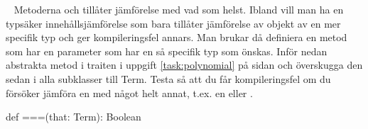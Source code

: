 \QUESTEND
















\QUESTBEGIN

\Task  \what~  Metoderna  och \code{==} tillåter jämförelse med vad som helst. Ibland vill man ha en typsäker innehållsjämförelse som bara tillåter jämförelse av objekt av en mer specifik typ och ger kompileringsfel annars. Man brukar då definiera en metod \code{===} som har en parameter  som har en så specifik typ som önskas. Inför nedan abstrakta metod \code{===} i traiten  i uppgift \ref{task:polynomial} på sidan \pageref{task:polynomial} och överskugga den sedan i alla subklasser till Term. Testa så att du får kompileringsfel om du försöker jämföra en  med något helt annat, t.ex. en  eller .
\begin{Code}
  def ===(that: Term): Boolean
\end{Code}


\SOLUTION


\TaskSolved \what



\QUESTEND







\QUESTBEGIN

